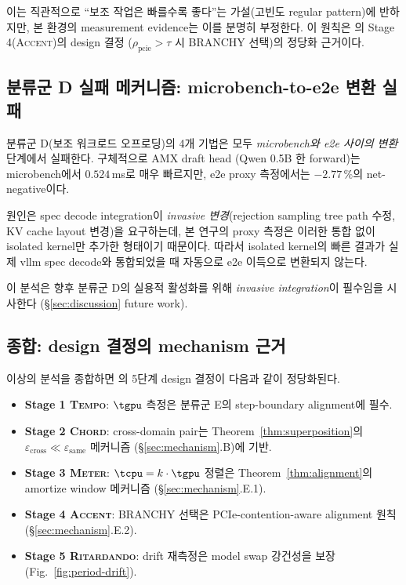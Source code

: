 \smallskip

이는 직관적으로 ``보조 작업은 빠를수록 좋다''는 가설(고빈도 regular pattern)에 반하지만, 본 환경의 measurement evidence는 이를 분명히 부정한다.
이 원칙은 \algname 의 Stage 4(\textsc{Accent})의 design 결정 ($\rho_{\text{pcie}} > \tau$ 시 BRANCHY 선택)의 정당화 근거이다.



\subsection{분류군 D 실패 메커니즘: microbench-to-e2e 변환 실패}

분류군 D(보조 워크로드 오프로딩)의 4개 기법은 모두 \emph{microbench와 e2e 사이의 변환} 단계에서 실패한다.
구체적으로 AMX draft head (Qwen 0.5B 한 forward)는 microbench에서 $0.524$\,ms로 매우 빠르지만, e2e proxy 측정에서는 $-2.77\,\%$의 net-negative이다.

원인은 spec decode integration이 \emph{invasive 변경}(rejection sampling tree path 수정, KV cache layout 변경)을 요구하는데, 본 연구의 proxy 측정은 이러한 통합 없이 isolated kernel만 추가한 형태이기 때문이다.
따라서 isolated kernel의 빠른 결과가 실제 vllm spec decode와 통합되었을 때 자동으로 e2e 이득으로 변환되지 않는다.

이 분석은 향후 분류군 D의 실용적 활성화를 위해 \emph{invasive integration}이 필수임을 시사한다 (\S\ref{sec:discussion} future work).

\subsection{종합: \algname design 결정의 mechanism 근거}

이상의 분석을 종합하면 \algname 의 5단계 design 결정이 다음과 같이 정당화된다.

\begin{itemize}
  \item \textbf{Stage 1 \textsc{Tempo}}: $\tgpu$ 측정은 분류군 E의 step-boundary alignment에 필수.
  \item \textbf{Stage 2 \textsc{Chord}}: cross-domain pair는 Theorem~\ref{thm:superposition}의 $\varepsilon_{\text{cross}} \ll \varepsilon_{\text{same}}$ 메커니즘 (\S\ref{sec:mechanism}.B)에 기반.
  \item \textbf{Stage 3 \textsc{Meter}}: $\tcpu = k \cdot \tgpu$ 정렬은 Theorem~\ref{thm:alignment}의 amortize window 메커니즘 (\S\ref{sec:mechanism}.E.1).
  \item \textbf{Stage 4 \textsc{Accent}}: BRANCHY 선택은 PCIe-contention-aware alignment 원칙 (\S\ref{sec:mechanism}.E.2).
  \item \textbf{Stage 5 \textsc{Ritardando}}: drift 재측정은 model swap 강건성을 보장 (Fig.~\ref{fig:period-drift}).
\end{itemize}
